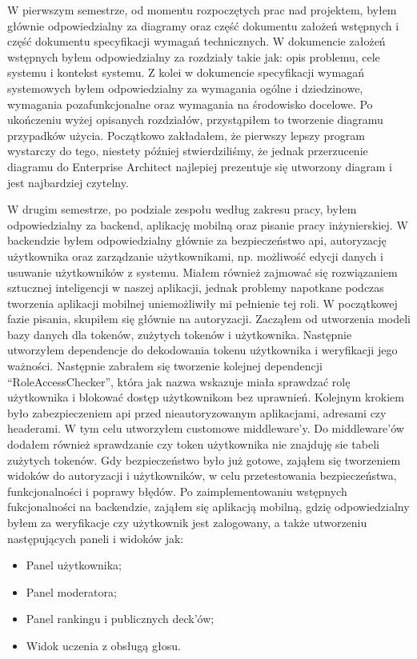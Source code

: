 W pierwszym semestrze, od momentu rozpoczętych prac nad projektem, byłem głównie odpowiedzialny za diagramy oraz część
dokumentu założeń wstępnych i część dokumentu specyfikacji wymagań technicznych. W dokumencie założeń wstępnych byłem
odpowiedzialny za rozdziały takie jak: opis problemu, cele systemu i kontekst systemu. Z kolei w dokumencie
specyfikacji wymagań systemowych byłem odpowiedzialny za wymagania ogólne i dziedzinowe, wymagania pozafunkcjonalne
oraz wymagania na środowisko docelowe. Po ukończeniu wyżej opisanych rozdziałów, przystąpiłem to tworzenie diagramu
przypadków użycia. Początkowo zakładałem, że pierwszy lepszy program wystarczy do tego, niestety później stwierdziliśmy,
że jednak przerzucenie diagramu do Enterprise Architect najlepiej prezentuje się utworzony diagram i jest najbardziej
czytelny.
\par W drugim semestrze, po podziale zespołu według zakresu pracy, byłem odpowiedzialny za backend, aplikację
mobilną oraz pisanie pracy inżynierskiej. W backendzie byłem odpowiedzialny głównie za bezpieczeństwo api, autoryzację
użytkownika oraz zarządzanie użytkownikami, np. możliwość edycji danych i usuwanie użytkowników z systemu.
Miałem również zajmować się rozwiązaniem sztucznej inteligencji w naszej aplikacji, jednak problemy napotkane podczas
tworzenia aplikacji mobilnej uniemożliwiły mi pełnienie tej roli. W początkowej fazie pisania, skupiłem się głównie na
autoryzacji. Zacząłem od utworzenia modeli bazy danych dla tokenów, zużytych tokenów i użytkownika. Następnie
utworzyłem dependencje do dekodowania tokenu użytkownika i weryfikacji jego ważności. Następnie zabrałem się tworzenie
kolejnej dependencji “RoleAccessChecker”, która jak nazwa wskazuje miała sprawdzać rolę użytkownika i blokować dostęp
użytkownikom bez uprawnień. Kolejnym krokiem było zabezpieczeniem api przed nieautoryzowanym aplikacjami, adresami czy
headerami. W tym celu utworzyłem customowe middleware’y. Do middleware’ów dodałem również sprawdzanie czy token
użytkownika nie znajduję sie tabeli zużytych tokenów. Gdy bezpieczeństwo było już gotowe, zająłem się tworzeniem
widoków do autoryzacji i użytkowników, w celu przetestowania bezpieczeństwa, funkcjonalności i poprawy błędów.
Po zaimplementowaniu wstępnych fukcjonalności na backendzie, zająłem się aplikacją mobilną, gdzię odpowiedzialny byłem
za weryfikacje czy użytkownik jest zalogowany, a także utworzeniu następujących paneli i widoków jak:

\begin{itemize}
    \item Panel użytkownika;
    \item Panel moderatora;
    \item Panel rankingu i publicznych deck’ów;
    \item Widok uczenia z obsługą głosu.
\end{itemize}

